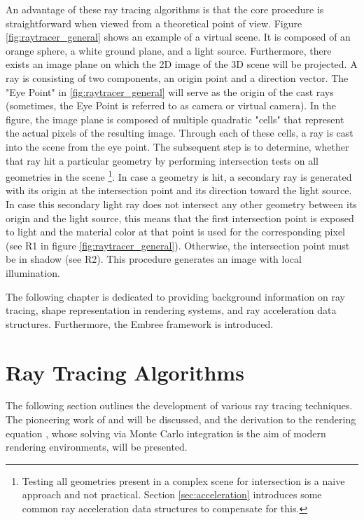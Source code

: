 An advantage of these ray tracing algorithms is that the core procedure is straightforward when viewed from a theoretical point of view. Figure \ref{fig:raytracer_general} shows an example of a virtual scene. It is composed of an orange sphere, a white ground plane, and a light source. Furthermore, there exists an image plane on which the 2D image of the 3D scene will be projected. A ray is consisting of two components, an origin point and a direction vector. The "Eye Point" in \ref{fig:raytracer_general} will serve as the origin of the cast rays (sometimes, the Eye Point is referred to as camera or virtual camera). In the figure, the image plane is composed of multiple quadratic "cells" that represent the actual pixels of the resulting image. Through each of these cells, a ray is cast into the scene from the eye point. The subsequent step is to determine, whether that ray hit a particular geometry by performing intersection tests on all geometries in the scene \footnote{Testing all geometries present in a complex scene for intersection is a naive approach and not practical. Section \ref{sec:acceleration} introduces some common ray acceleration data structures to compensate for this.}. In case a geometry is hit, a secondary ray is generated with its origin at the intersection point and its direction toward the light source. In case this secondary light ray does not intersect any other geometry between its origin and the light source, this means that the first intersection point is exposed to light and the material color at that point is used for the corresponding pixel (see R1 in figure \ref{fig:raytracer_general}). Otherwise, the intersection point must be in shadow (see R2). This procedure generates an image with local illumination.

The following chapter is dedicated to providing background information on ray tracing, shape representation in rendering systems, and ray acceleration data structures. Furthermore, the Embree framework is introduced.

\section{Ray Tracing Algorithms}

The following section outlines the development of various ray tracing techniques. The pioneering work of \cite{appel1968some} and \cite{whitted1979improved} will be discussed, and the derivation to the rendering equation \cite{kajiya1986rendering}, whose solving via Monte Carlo integration is the aim of modern rendering environments, will be presented.

